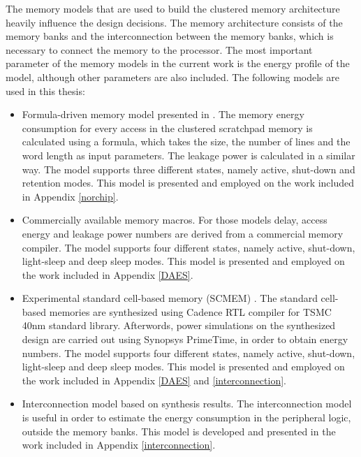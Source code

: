 The memory models that are used to build the clustered memory architecture heavily influence the design decisions.
The memory architecture consists of the memory banks and the interconnection between the memory banks, which is necessary to connect the memory to the processor.
The most important parameter of the memory models in the current work is the energy profile of the model, although other parameters are also included.
The following models are used in this thesis:
\begin{itemize}
\item Formula-driven memory model presented in \cite{Artes2011}.
The memory energy consumption for every access in the clustered scratchpad memory is calculated using a formula, which takes the size, the number of lines and the word length as input parameters.
The leakage power is calculated in a similar way.
The model supports three different states, namely active, shut-down and retention modes.
This model is presented and employed on the work included in Appendix \ref{norchip}.

\item Commercially available memory macros.  
For those models delay, access energy and leakage power numbers are derived from a commercial memory compiler.
The model supports four different states, namely active, shut-down, light-sleep and deep sleep modes.
This model is presented and employed on the work included in Appendix \ref{DAES}.

\item Experimental standard cell-based memory (SCMEM)  \cite{Mei11} .
The standard cell-based memories are synthesized using Cadence RTL compiler for TSMC 40nm standard library. 
Afterwords, power simulations on the synthesized design are carried out using Synopsys PrimeTime, in order to obtain energy numbers.
The model supports four different states, namely active, shut-down, light-sleep and deep sleep modes.
This model is presented and employed on the work included in Appendix \ref{DAES} and \ref{interconnection}.

\item Interconnection model based on synthesis results.
The interconnection model is useful in order to estimate the energy consumption in the peripheral logic, outside the memory banks.
This model is developed and presented in the work included in Appendix \ref{interconnection}.

\end{itemize}

